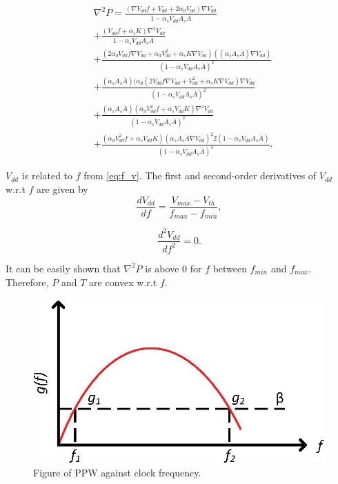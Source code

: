 \begin{appendices}
\begin{equation}\label{eq:p_transient_d2}
\begin{split}
&\nabla^{2} P =\frac{(\nabla V_{dd}f+V_{dd}+2\alpha_{d}V_{dd})\nabla V_{dd}}{1-\alpha_{s}V_{dd}A_{s}\bar{A}}\\
&+\frac{(V_{dd}f+\alpha_{s}K)\nabla^{2}V_{dd}}{1-\alpha_{s}V_{dd}A_{s}\bar{A}}\\
&+\frac{(2\alpha_{d}V_{dd}f\nabla V_{dd}+\alpha_{d}V_{dd}^{2}+\alpha_{s}K\nabla V_{dd})((\alpha_{s}A_{s}\bar{A})\nabla V_{dd} )}{(1-\alpha_{s}V_{dd}A_{s}\bar{A})^{2}}\\
&+\frac{(\alpha_{s}A_{s}\bar{A})(\alpha_{d}(2V_{dd}f\nabla V_{dd}+V_{dd}^{2}+\alpha_{s}K\nabla V_{dd})\nabla V_{dd}}{(1-\alpha_{s}V_{dd}A_{s}\bar{A})^{2}}\\
&+\frac{(\alpha_{s}A_{s}\bar{A})(\alpha_{d}V_{dd}^{2}f+\alpha_{s}V_{dd}K)\nabla^{2} V_{dd} }{(1-\alpha_{s}V_{dd}A_{s}\bar{A})^{2}}\\
&+\frac{(\alpha_{d}V_{dd}^{2}f+\alpha_{s}V_{dd}K)(\alpha_{s}A_{s}\bar{A}\nabla V_{dd})^{2} 2(1-\alpha_{s}V_{dd}A_{s}\bar{A})}{(1-\alpha_{s}V_{dd}A_{s}\bar{A})^{4}}.
\end{split}
\end{equation}


$V_{dd}$ is related to $f$ from \eqref{eq:f_v}. The first and second-order derivatives of $V_{dd}$ w.r.t $f$ are given by
\begin{equation}\label{eq:v_transient_d1}
\frac {dV_{dd}}{df} =\frac{V_{max}-V_{th}}{f_{max}-f_{min}},
\end{equation}

\begin{equation}\label{eq:v_transient_d1}
\frac {d^{2}V_{dd}}{df^{2}} =0.
\end{equation}

It can be easily shown that $\nabla^{2} P$ is above $0$ for $f$ between $f_{min}$ and $f_{max}$.
Therefore, $P$ and $T$ are convex w.r.t $f$.


\begin{figure}
\centering
\includegraphics[width=0.8\linewidth]{fig/concave.eps}
\caption{Figure of PPW against clock frequency.}
\label{fig:concave}
\end{figure}

\end{appendices}

